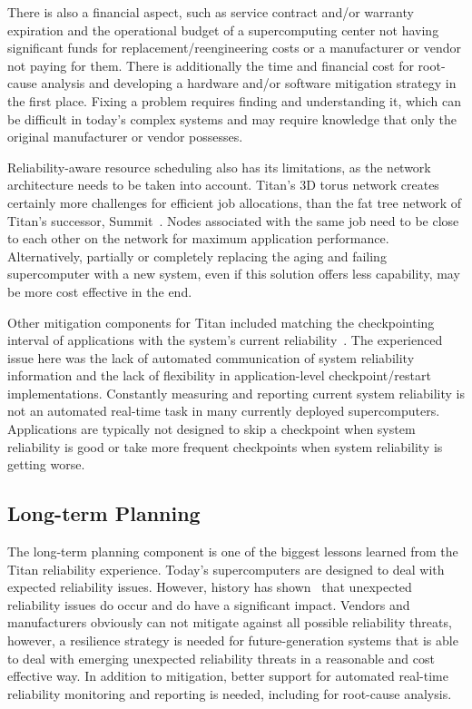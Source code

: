 There is also a financial aspect, such as service contract and/or warranty
expiration and the operational budget of a supercomputing center not having
significant funds for replacement/reengineering costs or a manufacturer or
vendor not paying for them.
%
There is additionally the time and financial cost for root-cause analysis and
developing a hardware and/or software mitigation strategy in the first place.
Fixing a problem requires finding and understanding it, which can be difficult 
in today's complex systems and may require knowledge that only the original 
manufacturer or vendor possesses.

Reliability-aware resource scheduling also has its limitations, as the network
architecture needs to be taken into account. Titan's 3D torus network creates
certainly more challenges for efficient job allocations, than the fat tree
network of Titan's successor, Summit~\cite{olcf:summit}. Nodes associated with
the same job need to be close to each other on the network for maximum
application performance.
%
Alternatively, partially or completely replacing the aging and failing
supercomputer with a new system, even if this solution offers less capability,
may be more cost effective in the end.

Other mitigation components for Titan included matching the checkpointing
interval of applications with the system's current
reliability~\cite{bautista-gomez16reducing, 6903564}. The experienced issue here
was the lack of automated communication of system reliability information and
the lack of flexibility in application-level checkpoint/restart implementations.
Constantly measuring and reporting current system reliability is not an automated
real-time task in many currently deployed supercomputers. Applications are
typically not designed to skip a checkpoint when system reliability is good or
take more frequent checkpoints when system reliability is getting worse.

\subsection{Long-term Planning}
\label{section:planning}

The long-term planning component is one of the biggest lessons learned from the
Titan reliability experience. Today's supercomputers are designed to deal with
expected reliability issues. However, history has shown~\cite{geist12kill} that
unexpected reliability issues do occur and do have a significant impact. Vendors
and manufacturers obviously can not mitigate against all possible reliability
threats, however, a resilience strategy is needed for future-generation systems
that is able to deal with emerging unexpected reliability threats in a
reasonable and cost effective way. In addition to mitigation, better support for
automated real-time reliability monitoring and reporting is needed, including
for root-cause analysis.

